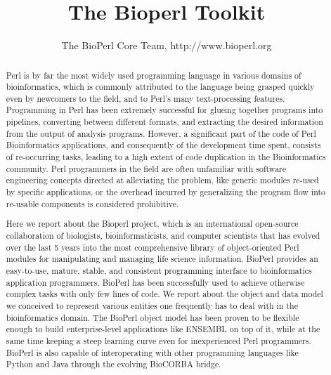 \documentclass{article}
\begin{document}
\begin{twocolumn}
\title{The Bioperl Toolkit}
\author{The BioPerl Core Team, http://www.bioperl.org}
\maketitle

\begin{abstract}

 Perl is by far the most widely used programming
language in various domains of bioinformatics, which is commonly
attributed to the language being grasped quickly even by newcomers to
the field, and to Perl's many text-processing features. Programming in
Perl has been extremely successful for glueing together programs into
pipelines, converting between different formats, and extracting the
desired information from the output of analysis programs. However, a
significant part of the code of Perl Bioinformatics applications, and
consequently of the development time spent, consists of re-occurring
tasks, leading to a high extent of code duplication in the
Bioinformatics community. Perl programmers in the field are often
unfamiliar with software engineering concepts directed at alleviating
the problem, like generic modules re-used by specific applications, or
the overhead incurred by generalizing the program flow into re-usable
components is considered prohibitive.

 Here we report about the Bioperl project, which is an
international open-source collaboration of biologists,
bioinformaticists, and computer scientists that has evolved over the
last 5 years into the most comprehensive library of
object-oriented Perl modules for manipulating and managing life
science information. BioPerl provides an easy-to-use, mature, stable,
and consistent programming interface to bioinformatics application
programmers. BioPerl has been successfully used to achieve
otherwise complex tasks with only few lines of code. We report about
the object and data model we conceived to represent various entities
one frequently has to deal with in the bioinformatics domain. The
BioPerl object model has been proven to be flexible enough to build
enterprise-level applications like ENSEMBL on top of it, while at the
same time keeping a steep learning curve even for inexperienced Perl
programmers. BioPerl is also capable of interoperating with other
programming languages like Python and Java through the evolving
BioCORBA bridge.


\end{abstract}
\end{twocolumn}
\end{document}

